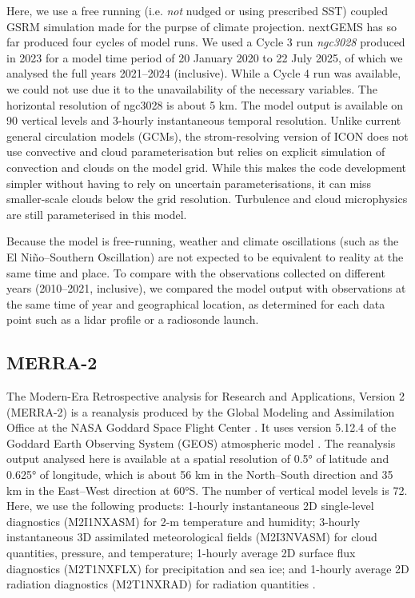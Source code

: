 \documentclass[12pt,a4paper]{article}
\begin{document}
Here, we use a free running (i.e. \emph{not} nudged or using prescribed SST)
coupled GSRM simulation made for the purpse of climate projection.  nextGEMS
has so far produced four cycles of model runs. We used a Cycle 3 run
\emph{ngc3028} produced in 2023 \citep{nextgems2023a,nextgems2023b} for a model
time period of 20 January 2020 to 22 July 2025, of which we analysed the full
years 2021--2024 (inclusive). While a Cycle 4 run was available, we could not
use due it to the unavailability of the necessary variables. The horizontal
resolution of ngc3028 is about 5 km.  The model output is available on 90
vertical levels and 3-hourly instantaneous temporal resolution.  Unlike current
general circulation models (GCMs), the strom-resolving version of ICON does not
use convective and cloud parameterisation but relies on explicit simulation of
convection and clouds on the model grid. While this makes the code development
simpler without having to rely on uncertain parameterisations, it can miss
smaller-scale clouds below the grid resolution.  Turbulence and cloud
microphysics are still parameterised in this model.

Because the model is free-running, weather and climate oscillations (such as
the El Niño--Southern Oscillation) are not expected to be equivalent to reality
at the same time and place. To compare with the observations collected on
different years (2010--2021, inclusive), we compared the model output with
observations at the same time of year and geographical location, as determined
for each data point such as a lidar profile or a radiosonde launch.

\subsection{MERRA-2}

The Modern-Era Retrospective analysis for Research and Applications, Version 2
(MERRA-2) is a reanalysis produced by the Global Modeling and Assimilation
Office at the NASA Goddard Space Flight Center \citep{gelaro2017}.  It uses
version 5.12.4 of the Goddard Earth Observing System (GEOS) atmospheric model
\citep{rienecker2008,molod2015}. The reanalysis output analysed here is
available at a spatial resolution of 0.5° of latitude and 0.625° of longitude,
which is about 56 km in the North--South direction and 35 km in the East--West
direction at 60°S. The number of vertical model levels is 72. Here, we use the
following products: 1-hourly instantaneous 2D single-level diagnostics
(M2I1NXASM) for 2-m temperature and humidity; 3-hourly instantaneous 3D
assimilated meteorological fields (M2I3NVASM) for cloud quantities, pressure,
and temperature; 1-hourly average 2D surface flux diagnostics (M2T1NXFLX) for
precipitation and sea ice; and 1-hourly average 2D radiation diagnostics
(M2T1NXRAD) for radiation quantities \citep{merra2}.
\end{document}
